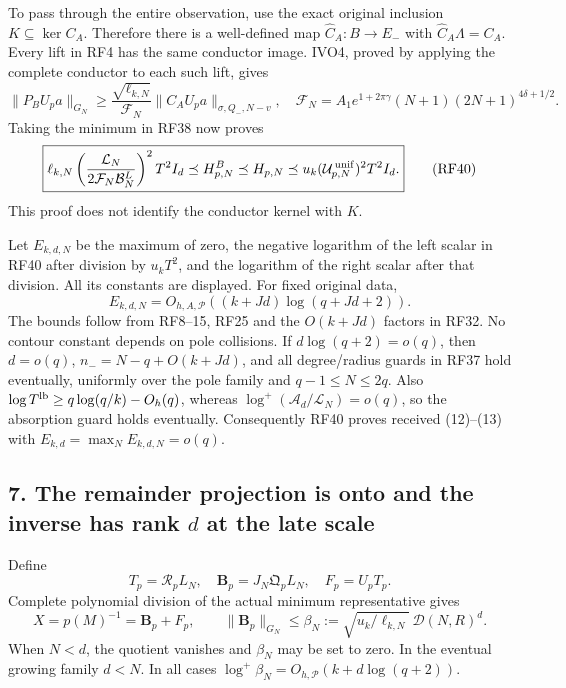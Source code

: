 \documentclass[11pt]{article}
\begin{document}
To pass through the entire observation, use the exact original inclusion \(K\subseteq\ker C_A\). Therefore there is a well-defined map \(\widehat C_A:B\to E_-\) with \(\widehat C_A\Lambda=C_A\). Every lift in RF4 has the same conductor image. IVO4, proved by applying the complete conductor to each such lift, gives \[
\|P_BU_pa\|_{G_N}\ge
\frac{\sqrt{\ell_{k,N}}}{\mathcal F_N}
\|C_AU_pa\|_{\sigma,Q_-,N-v},\quad
\mathcal F_N=A_1e^{1+2\pi\gamma}(N+1)(2N+1)^{4\delta+1/2}.
\tag{RF39}
\] Taking the minimum in RF38 now proves \[
\boxed{
\ell_{k,N}\left(\frac{\mathcal L_N}
 {2\mathcal F_N\mathcal B_N^L}\right)^2T^2I_d
\preceq H^B_{p,N}\preceq H_{p,N}
\preceq u_k(\mathcal U_{p,N}^{\,\rm unif})^2T^2I_d.}
\tag{RF40}
\] This proof does not identify the conductor kernel with \(K\).

Let \(E_{k,d,N}\) be the maximum of zero, the negative logarithm of the left scalar in RF40 after division by \(u_kT^2\), and the logarithm of the right scalar after that division. All its constants are displayed. For fixed original data, \[
E_{k,d,N}=O_{h,A,\mathscr P}((k+Jd)\log(q+Jd+2)).
\tag{RF41}
\] The bounds follow from RF8--15, RF25 and the \(O(k+Jd)\) factors in RF32. No contour constant depends on pole collisions. If \(d\log(q+2)=o(q)\), then \(d=o(q)\), \(n_-=N-q+O(k+Jd)\), and all degree/radius guards in RF37 hold eventually, uniformly over the pole family and \(q-1\le N\le2q\). Also \(\log T^{\rm lb}\ge q\log(q/k)-O_h(q)\), whereas \(\log^+(\mathcal A_d/\mathcal L_N)=o(q)\), so the absorption guard holds eventually. Consequently RF40 proves received (12)--(13) with \(E_{k,d}=\max_NE_{k,d,N}=o(q)\).

\subsection{\texorpdfstring{7. The remainder projection is onto and the inverse has rank \(d\) at the late scale}{7. The remainder projection is onto and the inverse has rank d at the late scale}}\label{the-remainder-projection-is-onto-and-the-inverse-has-rank-d-at-the-late-scale}

Define \[
T_p=\mathcal R_pL_N,\quad
\mathbf B_p=J_N\mathfrak Q_pL_N,\quad F_p=U_pT_p.
\] Complete polynomial division of the actual minimum representative gives \[
X=p(M)^{-1}=\mathbf B_p+F_p,\qquad
\|\mathbf B_p\|_{G_N}\le
\beta_N:=\sqrt{u_k/\ell_{k,N}}\,\mathcal D(N,R)^d.
\tag{RF42}
\] When \(N<d\), the quotient vanishes and \(\beta_N\) may be set to zero. In the eventual growing family \(d<N\). In all cases \(\log^+\beta_N=O_{h,\mathscr P}(k+d\log(q+2))\).
\end{document}
